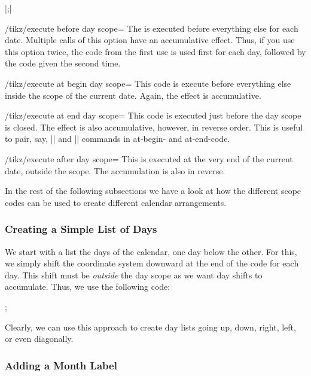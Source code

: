 \begin{command}{\calendar {}|;|}
  \begin{key}{/tikz/execute before day scope=}
    The  is executed before everything else for each
    date. Multiple 
    calls of this option have an accumulative effect. Thus, if you use
    this option twice, the code from the first use is used first for
    each day, followed by the code given the second time.
  \end{key}
  \begin{key}{/tikz/execute at begin day scope=}
    This code is execute before everything else inside the scope of
    the current date. Again, the effect is accumulative.
  \end{key}
  \begin{key}{/tikz/execute at end day scope=}
    This code is executed just before the day scope is
    closed. The effect is also accumulative, however, in reverse
    order. This is useful to pair, say, |\scope| and |\endscope|
    commands in at-begin- and at-end-code.
  \end{key}
  \begin{key}{/tikz/execute after day scope=}
    This is executed at the very end of the current date, outside the 
    scope. The accumulation is also in reverse.
  \end{key}    
\end{command}


In the rest of the following subsections we have a look at how the
different scope codes can be used to create different calendar
arrangements. 


\subsubsection{Creating a Simple List of Days}

We start with a list the days of the calendar, one day below the
other. For this, we simply shift the coordinate system downward at the
end of the code for each day. This shift must be \emph{outside} the
day scope as we want day shifts to accumulate. Thus, we use the
following code: 
\begin{codeexample}[]
\tikz
  \calendar [dates=2000-01-01 to 2000-01-08,
             execute after day scope=
               {\pgftransformyshift{-1em}}];
\end{codeexample}
Clearly, we can use this approach to create day lists going up,
down, right, left, or even diagonally.


\subsubsection{Adding a Month Label}

